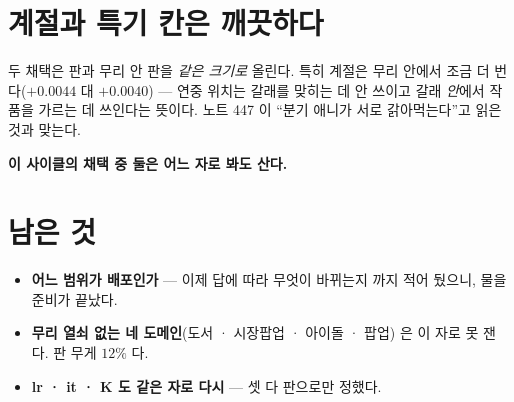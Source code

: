 \documentclass[11pt]{article}
\begin{document}
\section{계절과 특기 칸은 깨끗하다}

두 채택은 판과 무리 안 판을 \emph{같은 크기로} 올린다. 특히 계절은
무리 안에서 조금 더 번다($+0.0044$ 대 $+0.0040$) --- 연중 위치는 갈래를
맞히는 데 안 쓰이고 갈래 \emph{안}에서 작품을 가르는 데 쓰인다는 뜻이다.
노트 447 이 ``분기 애니가 서로 갉아먹는다''고 읽은 것과 맞는다.

\textbf{이 사이클의 채택 중 둘은 어느 자로 봐도 산다.}

\section*{남은 것}

\begin{itemize}
\item \textbf{어느 범위가 배포인가} --- 이제 답에 따라 무엇이 바뀌는지
까지 적어 뒀으니, 물을 준비가 끝났다.
\item \textbf{무리 열쇠 없는 네 도메인}(도서 · 시장팝업 · 아이돌 · 팝업)
은 이 자로 못 잰다. 판 무게 $12\%$ 다.
\item \textbf{lr · it · K 도 같은 자로 다시} --- 셋 다 판으로만 정했다.
\end{itemize}
\end{document}
